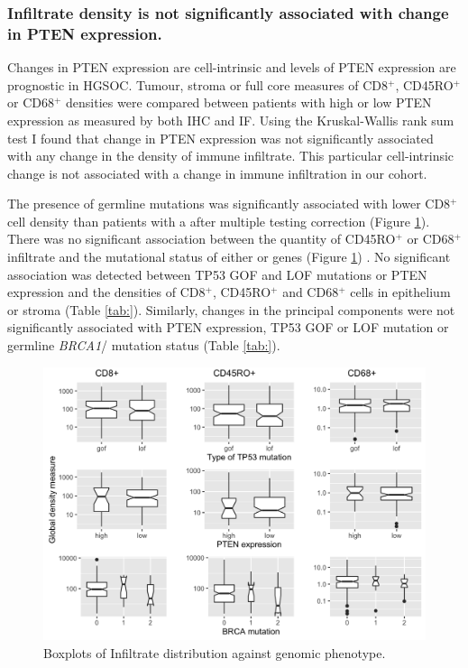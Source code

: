 \subsubsection{Infiltrate density is not significantly associated with change in PTEN expression.}
Changes in PTEN expression are cell-intrinsic and levels of PTEN expression are prognostic in HGSOC\cite{RN17, RN15}. Tumour, stroma or full core measures of CD8$^+$, CD45RO$^+$ or CD68$^+$ densities were compared between patients with high or low PTEN expression as measured by both IHC and IF. Using the Kruskal-Wallis rank sum test I found that change in PTEN expression was not significantly associated with any change in the density of immune infiltrate. This particular cell-intrinsic change is not associated with a change in immune infiltration in our cohort.

The presence of germline  mutations was significantly associated with lower CD8$^+$ cell density than patients with a  after multiple testing correction (Figure \ref{fig:genomic}). There was no significant association between the quantity of CD45RO$^+$ or CD68$^+$ infiltrate and the mutational status of either  or  genes (Figure \ref{fig:genomic}) . No significant association was detected between TP53 GOF and LOF mutations or PTEN expression and the densities of CD8$^+$, CD45RO$^+$ and CD68$^+$ cells in epithelium or stroma (Table \ref{tab:}). Similarly, changes in the principal components were not significantly associated with PTEN expression, TP53 GOF or LOF mutation or germline \textit{BRCA1}/ mutation status (Table \ref{tab:}). 

\begin{figure}
    \centering
    \includegraphics[width=\textwidth]{Chapter2/Figs/Raster/genomic.png}
    \caption{Boxplots of Infiltrate distribution against genomic phenotype.}
    \label{fig:genomic}
    
\end{figure}


